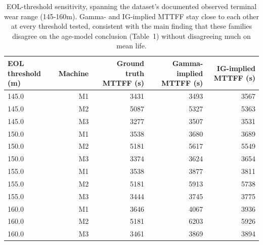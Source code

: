 \begin{table}[t]
\centering
\caption{EOL-threshold sensitivity, spanning the dataset's documented observed terminal wear range (145-160\textmu m). Gamma- and IG-implied MTTFF stay close to each other at every threshold tested, consistent with the main finding that these families disagree on the age-model conclusion (Table~1) without disagreeing much on mean life.}
\label{tab:eol-threshold-sensitivity}
\begin{tabular}{lrrrr}
\toprule
EOL threshold (\textmu{}m) & Machine & Ground truth MTTFF (s) & Gamma-implied MTTFF (s) & IG-implied MTTFF (s) \\
\midrule
145.0 & M1 & 3431 & 3493 & 3567 \\
145.0 & M2 & 5087 & 5327 & 5363 \\
145.0 & M3 & 3277 & 3507 & 3531 \\
150.0 & M1 & 3538 & 3680 & 3689 \\
150.0 & M2 & 5181 & 5617 & 5549 \\
150.0 & M3 & 3374 & 3624 & 3654 \\
155.0 & M1 & 3538 & 3877 & 3811 \\
155.0 & M2 & 5181 & 5913 & 5738 \\
155.0 & M3 & 3444 & 3745 & 3775 \\
160.0 & M1 & 3646 & 4067 & 3936 \\
160.0 & M2 & 5181 & 6203 & 5926 \\
160.0 & M3 & 3461 & 3869 & 3894 \\
\bottomrule
\end{tabular}
\end{table}
